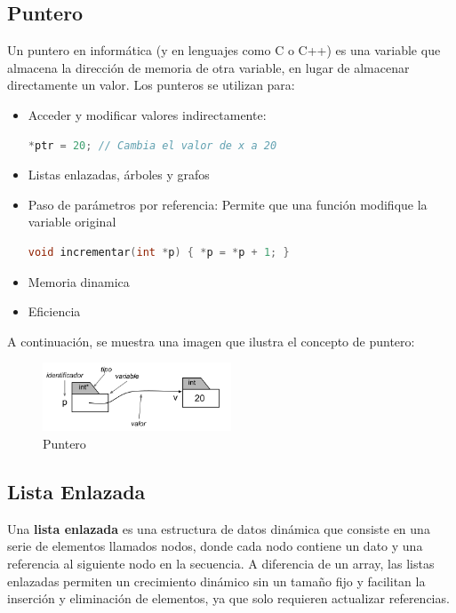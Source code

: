    \subsection{Puntero}
    Un puntero en informática (y en lenguajes como C o C++) es una variable que almacena la dirección de memoria de otra variable, en lugar de almacenar directamente un valor.
    Los punteros se utilizan para:
    \begin{itemize}
        \item Acceder y modificar valores indirectamente:
            \begin{lstlisting}[style=CodeStyle, language=C, caption={Acceder y modificar valores indirectamente}, label={lst:codigo}]
            *ptr = 20; // Cambia el valor de x a 20
            \end{lstlisting}
        \item Listas enlazadas, árboles y grafos
        \item Paso de parámetros por referencia: Permite que una función modifique la variable original
            \begin{lstlisting}[style=CodeStyle, language=C, caption={Paso de parámetros por referencia}, label={lst:codigo}]
                void incrementar(int *p) { *p = *p + 1; }
            \end{lstlisting}
        \item Memoria dinamica
        \item Eficiencia
    \end{itemize}
    A continuación, se muestra una imagen que ilustra el concepto de puntero:
    \begin{figure}[H]
        \centering %
        \includegraphics[width=0.5\textwidth]{./src/images/puntero.png} 
        \caption{Puntero} 
        \label{fig: puntero} 
    \end{figure}

    \subsection{Lista Enlazada}
    Una \textbf{lista enlazada} es una estructura de datos dinámica que consiste en una serie de elementos llamados nodos, donde cada nodo contiene un dato y una referencia 
    al siguiente nodo en la secuencia. A diferencia de un array, las listas enlazadas permiten un crecimiento dinámico sin un tamaño fijo y facilitan la inserción 
    y eliminación de elementos, ya que solo requieren actualizar referencias.\\

